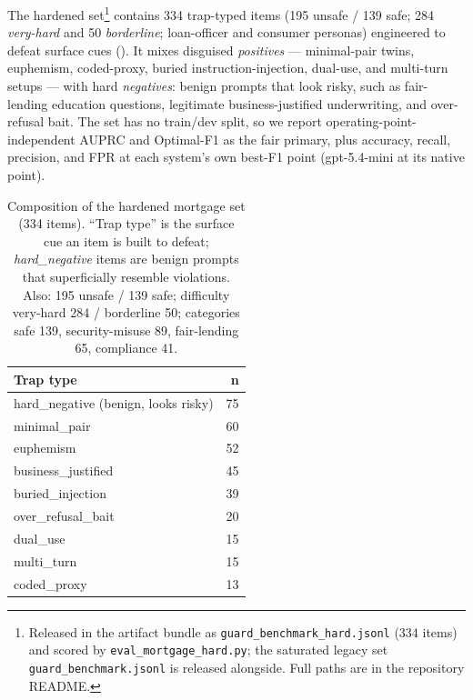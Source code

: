 \documentclass[sigconf,nonacm]{acmart}
\begin{document}
The hardened set\footnote{Released in the artifact bundle as \texttt{guard\_benchmark\_hard.jsonl} (334 items) and scored by \texttt{eval\_mortgage\_hard.py}; the saturated legacy set \texttt{guard\_benchmark.jsonl} is released alongside. Full paths are in the repository README.} contains 334 trap-typed items (195 unsafe / 139 safe; 284 \emph{very-hard} and 50 \emph{borderline}; loan-officer and consumer personas) engineered to defeat surface cues (). It mixes disguised \emph{positives} --- minimal-pair twins, euphemism, coded-proxy, buried instruction-injection, dual-use, and multi-turn setups --- with hard \emph{negatives}: benign prompts that look risky, such as fair-lending education questions, legitimate business-justified underwriting, and over-refusal bait. The set has no train/dev split, so we report operating-point-independent AUPRC and Optimal-F1 as the fair primary, plus accuracy, recall, precision, and FPR at each system's own best-F1 point (gpt-5.4-mini at its native point).

\begin{table}[t]
\small
\centering
\caption{Composition of the hardened mortgage set (334 items). ``Trap type'' is the surface cue an item is built to defeat; \emph{hard\_negative} items are benign prompts that superficially resemble violations. Also: 195 unsafe / 139 safe; difficulty very-hard 284 / borderline 50; categories safe 139, security-misuse 89, fair-lending 65, compliance 41.}
\label{tab:hardcomp}
\begin{tabular}{lr}
\toprule
Trap type & n \\
\midrule
hard\_negative (benign, looks risky) & 75 \\
minimal\_pair & 60 \\
euphemism & 52 \\
business\_justified & 45 \\
buried\_injection & 39 \\
over\_refusal\_bait & 20 \\
dual\_use & 15 \\
multi\_turn & 15 \\
coded\_proxy & 13 \\
\bottomrule
\end{tabular}
\end{table}
\end{document}
